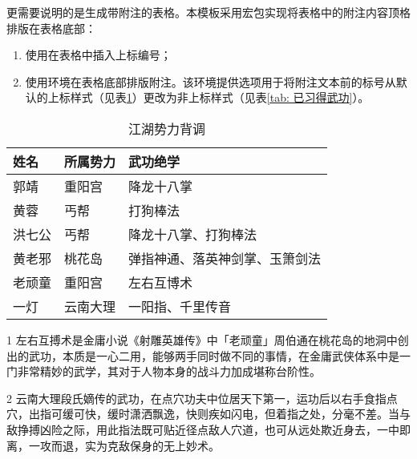\documentclass[print, doctor, vlined]{DissertUESTC}
\begin{document}
	更需要说明的是生成带附注的表格。本模板采用宏包实现将表格中的附注内容顶格排版在表格底部：
	\begin{enumerate}
		\item 使用在表格中插入上标编号；
		\setcounter{enumi}{98}
		\item 使用环境在表格底部排版附注。该环境提供选项用于将附注文本前的标号从默认的上标样式（见表\ref{tab: 江湖势力背调}）更改为非上标样式（见表\ref{tab: 已习得武功}）。
	\end{enumerate}
	
	\begin{table}[!ht]
		\caption{江湖势力背调} \label{tab: 江湖势力背调}
		\begin{threeparttable}
			\begin{tabular}{p{2cm} p{3cm} p{7cm}}
				\toprule
				\textbf{姓名} & \textbf{所属势力} & \textbf{武功绝学} \\
				\midrule
				郭靖 & 重阳宫 & 降龙十八掌 \\
				黄蓉 & 丐帮 & 打狗棒法 \\
				洪七公 & 丐帮 & 降龙十八掌、打狗棒法 \\
				黄老邪 & 桃花岛 & 弹指神通、落英神剑掌、玉箫剑法 \\
				老顽童 & 重阳宫 & 左右互博术\tnote{1} \\
				一灯 & 云南大理 & 一阳指\tnote{2}、千里传音 \\
				\bottomrule
			\end{tabular}
			\begin{tablenotes}
				\item[1] 左右互搏术是金庸小说《射雕英雄传》中「老顽童」周伯通在桃花岛的地洞中创出的武功，本质是一心二用，能够两手同时做不同的事情，在金庸武侠体系中是一门非常精妙的武学，其对于人物本身的战斗力加成堪称台阶性。
				\item[2] 云南大理段氏嫡传的武功，在点穴功夫中位居天下第一，运功后以右手食指点穴，出指可缓可快，缓时潇洒飘逸，快则疾如闪电，但着指之处，分毫不差。当与敌挣搏凶险之际，用此指法既可贴近径点敌人穴道，也可从远处欺近身去，一中即离，一攻而退，实为克敌保身的无上妙术。
			\end{tablenotes}
		\end{threeparttable}
	\end{table}
	
\end{document}
